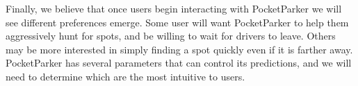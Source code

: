 Finally, we believe that once users begin interacting with PocketParker we
will see different preferences emerge. Some user will want PocketParker to
help them aggressively hunt for spots, and be willing to wait for drivers to
leave. Others may be more interested in simply finding a spot quickly even if
it is farther away. PocketParker has several parameters that can control its
predictions, and we will need to determine which are the most intuitive to
users.

%
%
%
%
%
%
%
